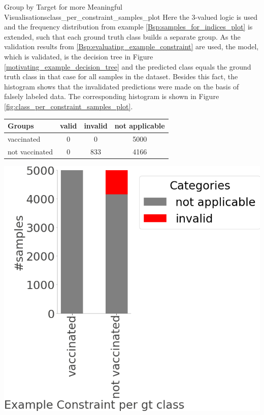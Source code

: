 \begin{Bsp}{Group by Target for more Meaningful Visualisations}{class_per_constraint_samples_plot}
    Here the 3-valued logic is used and the frequency distribution from example \ref{Bsp:samples_for_indices_plot} is extended, such that each ground truth class builds a separate group. As the validation results from \ref{Bsp:evaluating_example_constraint} are used, the model, which is validated, is the decision tree in Figure \ref{motivating_example_decision_tree} and the predicted class equals the ground truth class in that case for all samples in the dataset. Besides this fact, the histogram shows that the invalidated predictions were made on the basis of falsely labeled data. The corresponding histogram is shown in Figure \ref{fig:class_per_constraint_samples_plot}.
    
    \captionsetup{type=htypei} 
    \begin{minipage}[t]{\linewidth}
        \vspace{1ex}
        \centering
        \begin{tabular}{l|ccc}
            \toprule
             Groups & valid & invalid & not applicable \\
             \midrule
             vaccinated & 0 & 0 & 5000 \\
             not vaccinated & 0 & 833 & 4166 \\
             \bottomrule
        \end{tabular}    
        \label{fig:class_per_constraint_samples_table}
    \end{minipage}
        \captionsetup{type=htypei}
        \begin{minipage}[t]{\linewidth}
            \vspace{1ex}
            \centering
            \includegraphics[scale=.25]{images/visualizations/example_constraint_per_gt_class.png}    

\end{minipage}
\end{Bsp}
